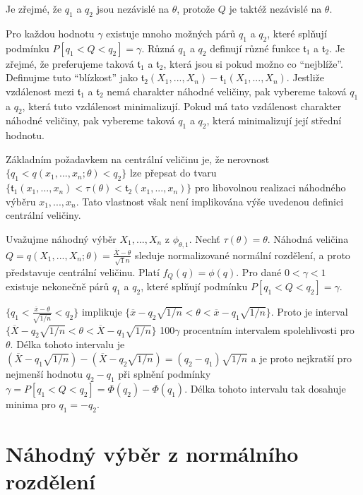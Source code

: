 Je zřejmé, že $q_1$ a $q_2$ jsou nezávislé na $\theta$, protože $Q$ je taktéž nezávislé na $\theta$.

Pro každou hodnotu $\gamma$ existuje mnoho možných párů $q_1$ a $q_2$, které splňují podmínku $P[q_1 < Q < q_2] = \gamma$. Různá $q_1$ a $q_2$ definují různé funkce $\mathfrak{t}_1$ a $\mathfrak{t}_2$. Je zřejmé, že preferujeme taková $\mathfrak{t}_1$ a $\mathfrak{t}_2$, která jsou si pokud možno co ``nejblíže''. Definujme tuto ``blízkost'' jako $\mathfrak{t}_2(X_1, ..., X_n) - \mathfrak{t}_1(X_1, ..., X_n)$. Jestliže vzdálenost mezi $\mathfrak{t}_1$ a $\mathfrak{t}_2$ nemá charakter náhodné veličiny, pak vybereme taková $q_1$ a $q_2$, která tuto vzdálenost minimalizují. Pokud má tato vzdálenost charakter náhodné veličiny, pak vybereme taková $q_1$ a $q_2$, která minimalizují její střední hodnotu.

Základním požadavkem na centrální veličinu je, že nerovnost $\{q_1 < \mathit{q}(x_1, ..., x_n; \theta) < q_2\}$ lze přepsat do tvaru $\{\mathfrak{t}_1(x_1, ..., x_n) < \tau(\theta) < \mathfrak{t}_2(x_1, ..., x_n)\}$ pro libovolnou realizaci náhodného výběru $x_1, ..., x_n$. Tato vlastnost však není implikována výše uvedenou definici centrální veličiny.

\begin{example}
Uvažujme náhodný výběr $X_1, ..., X_n$ z $\phi_{\theta, 1}$. Nechť $\tau(\theta) = \theta$. Náhodná veličina $Q = \mathit{q}(X_1, ..., X_n; \theta) = \frac{\overline{X} - \theta}{\sqrt{1}{n}}$ sleduje normalizované normální rozdělení, a proto představuje centrální veličinu. Platí $f_Q(q) = \phi(q)$. Pro dané $0 < \gamma < 1$ existuje nekonečně párů $q_1$ a $q_2$, které splňují podmínku $P[q_1 < Q < q_2] = \gamma$.

$\{q_1 < \frac{\overline{x} - \theta}{\sqrt{1/n}} < q_2\}$ implikuje $\{\overline{x} - q_2\sqrt{1/n} < \theta < \overline{x} - q_1 \sqrt{1/n}\}$. Proto je interval  $\{\overline{X} - q_2\sqrt{1/n} < \theta < \overline{X} - q_1 \sqrt{1/n}\}$ 100$\gamma$ procentním intervalem spolehlivosti pro $\theta$. Délka tohoto intervalu je $(\overline{X} - q_1\sqrt{1/n}) - (\overline{X} - q_2 \sqrt{1/n}) = (q_2 - q_1)\sqrt{1/n}$ a je proto nejkratší pro nejmenší hodnotu $q_2 - q_1$ při splnění podmínky $\gamma = P[q_1 < Q < q_2] = \Phi(q_2) - \Phi(q_1)$. Délka tohoto intervalu tak dosahuje minima pro $q_1 = - q_2$.
\end{example}

\section{Náhodný výběr z normálního rozdělení}


